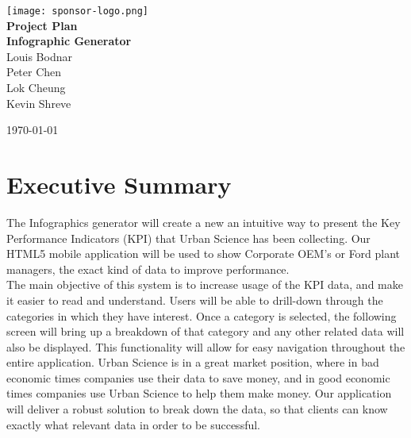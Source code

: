 \documentclass[11pt,a4paper,oneside]{article}
\begin{document}
\begin{titlepage}

\begin{center}

\texttt{[image: sponsor-logo.png]}\\[1cm]    

{ \huge \bfseries Project Plan}\\[0.4cm]
{ \large \bfseries Infographic Generator}\\[0.4cm]

Louis Bodnar\\
Peter Chen\\
Lok Cheung\\
Kevin Shreve\\



\vfill

{\large \today}

\end{center}

\end{titlepage}

\tableofcontents

\newpage

\section{Executive Summary}


The Infographics generator will create a new an intuitive way to present the Key Performance Indicators (KPI) that Urban Science has been collecting. Our HTML5 mobile application will be used to show Corporate OEM’s or Ford plant managers, the exact kind of data to improve performance.\\

The main objective of this system is to increase usage of the KPI data, and make it easier to read and understand. Users will be able to drill-down through the categories in which they have interest. Once a category is selected, the following screen will bring up a breakdown of that category and any other related data will also be displayed. This functionality will allow for easy navigation throughout the entire application. Urban Science is in a great market position, where in bad economic times companies use their data to save money, and in good economic times companies use Urban Science to help them make money. Our application will deliver a robust solution to break down the data, so that clients can know exactly what relevant data in order to be successful.\\
\end{document}
